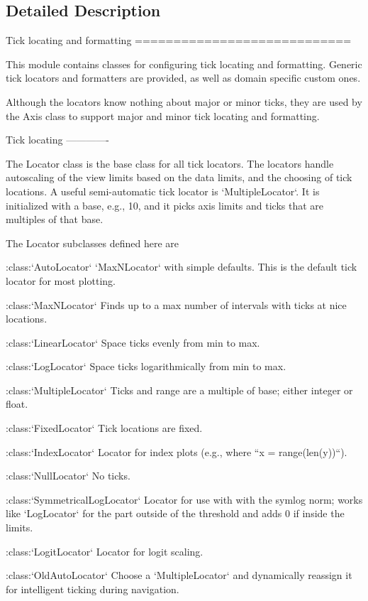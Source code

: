 \subsection{Detailed Description}
\begin{DoxyVerb}Tick locating and formatting
============================

This module contains classes for configuring tick locating and formatting.
Generic tick locators and formatters are provided, as well as domain specific
custom ones.

Although the locators know nothing about major or minor ticks, they are used
by the Axis class to support major and minor tick locating and formatting.

Tick locating
-------------

The Locator class is the base class for all tick locators. The locators
handle autoscaling of the view limits based on the data limits, and the
choosing of tick locations. A useful semi-automatic tick locator is
`MultipleLocator`. It is initialized with a base, e.g., 10, and it picks
axis limits and ticks that are multiples of that base.

The Locator subclasses defined here are

:class:`AutoLocator`
    `MaxNLocator` with simple defaults.  This is the default tick locator for
    most plotting.

:class:`MaxNLocator`
    Finds up to a max number of intervals with ticks at nice locations.

:class:`LinearLocator`
    Space ticks evenly from min to max.

:class:`LogLocator`
    Space ticks logarithmically from min to max.

:class:`MultipleLocator`
    Ticks and range are a multiple of base; either integer or float.

:class:`FixedLocator`
    Tick locations are fixed.

:class:`IndexLocator`
    Locator for index plots (e.g., where ``x = range(len(y))``).

:class:`NullLocator`
    No ticks.

:class:`SymmetricalLogLocator`
    Locator for use with with the symlog norm; works like `LogLocator` for the
    part outside of the threshold and adds 0 if inside the limits.

:class:`LogitLocator`
    Locator for logit scaling.

:class:`OldAutoLocator`
    Choose a `MultipleLocator` and dynamically reassign it for intelligent
    ticking during navigation.


\end{DoxyVerb}
